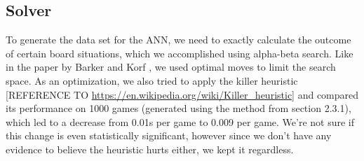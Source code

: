 \subsection{Solver}

To generate the data set for the ANN, we need to exactly calculate the outcome of certain board situations, which we accomplished using alpha-beta search. Like in the paper by Barker and Korf \cite{Barker:2012:SD:2900728.2900788}, we used optimal moves to limit the search space. As an optimization, we also tried to apply the killer heuristic [REFERENCE TO \url{https://en.wikipedia.org/wiki/Killer_heuristic}] and compared its performance on 1000 games (generated using the method from section 2.3.1), which led to a decrease from 0.01s per game to 0.009 per game. We're not sure if this change is even statistically significant, however since we don't have any evidence to believe the heuristic hurts either, we kept it regardless.